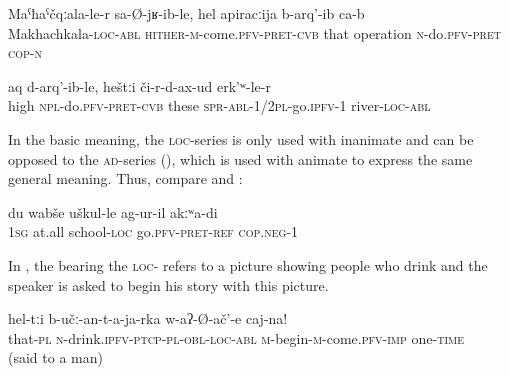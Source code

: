 \begin{exe}
	\ex	\label{ex:He came back from Makhachkala and had the operation}
	\gll	Maˁħaˁčqːala-le-r	sa-Ø-jʁ-ib-le,	hel	apiracːija	b-arq'-ib ca-b\\
		Makhachkala-\textsc{loc}-\textsc{abl}	\textsc{hither-m}-come.\textsc{pfv}-\textsc{pret}-\textsc{cvb} that operation	\textsc{n}-do.\textsc{pfv}-\textsc{pret} \textsc{cop-n}\\
	\glt	{}

	\ex	\label{ex:We take up (the trousers) and go across the river}
	\gll	aq	d-arq'-ib-le,	heštːi	či-r-d-ax-ud	erk'ʷ-le-r\\
		high	\textsc{npl}-do.\textsc{pfv}-\textsc{pret}-\textsc{cvb}	these	\textsc{spr}-\textsc{abl}-1/2\textsc{pl}-go.\textsc{ipfv}-1	river-\textsc{loc}-\textsc{abl}\\
	\glt	{}
\end{exe}


In the basic meaning, the \textsc{loc}-series is only used with inanimate  and can be opposed to the \textsc{ad}-series (), which is used with animate  to express the same general meaning. Thus, compare  and :
%
\begin{exe}
	\ex	\label{ex:I did not go to school at all}
	\gll	du	wabše	uškul-le	ag-ur-il	akːʷa-di \\
		1\textsc{sg}	at.all	school-\textsc{loc}	go.\textsc{pfv}-\textsc{pret}-\textsc{ref}	\textsc{cop.neg}-1\\
	\glt	{}
\end{exe}

In , the  bearing the \textsc{loc-} refers to a picture showing people who drink and the speaker is asked to begin his story with this picture.
%
\begin{exe}
	\ex	\label{ex:First begin with these who drink}
	\gll	hel-tːi	b-učː-an-t-a-ja-rka	w-aʔ-Ø-ač'-e	caj-na! \\
		that-\textsc{pl}	\textsc{n}-drink.\textsc{ipfv}-\textsc{ptcp}-\textsc{pl}-\textsc{obl}-\textsc{loc}-\textsc{abl}	\textsc{m}-begin-\textsc{m}-come.\textsc{pfv}-\textsc{imp} one-\textsc{time}\\
	\glt	{} (said to a man)
\end{exe}

